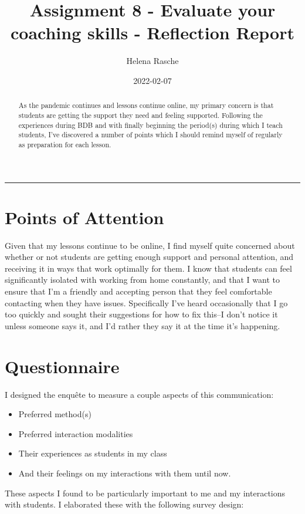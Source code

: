 \documentclass[paper=a4,justified,a4paper]{tufte-handout}
\title[A8 - Evaluation of Coaching Skills]{Assignment 8 - Evaluate your coaching skills - Reflection Report}
\author{Helena Rasche}
\date{2022-02-07}
\providecommand{\tightlist}{%
  \setlength{\itemsep}{0pt}\setlength{\parskip}{0pt}}
\begin{document}
\maketitle
\begin{abstract}
As the pandemic continues and lessons continue online, my primary
concern is that students are getting the support they need and feeling
supported. Following the experiences during BDB and with finally
beginning the period(s) during which I teach students, I've discovered a
number of points which I should remind myself of regularly as
preparation for each lesson.
\end{abstract}
\noindent\rule{5in}{0.4pt}


\hypertarget{points-of-attention}{%
\section{Points of Attention}\label{points-of-attention}}

Given that my lessons continue to be online, I find myself quite
concerned about whether or not students are getting enough support and
personal attention, and receiving it in ways that work optimally for
them. I know that students can feel significantly isolated with working
from home constantly, and that I want to ensure that I'm a friendly and
accepting person that they feel comfortable contacting when they have
issues. Specifically I've heard occasionally that I go too quickly and
sought their suggestions for how to fix this--I don't notice it unless
someone says it, and I'd rather they say it at the time it's happening.

\hypertarget{questionnaire}{%
\section{Questionnaire}\label{questionnaire}}

I designed the enquête to measure a couple aspects of this
communication:

\begin{itemize}
\tightlist
\item
  Preferred method(s)
\item
  Preferred interaction modalities
\item
  Their experiences as students in my class
\item
  And their feelings on my interactions with them until now.
\end{itemize}

These aspects I found to be particularly important to me and my
interactions with students. I elaborated these with the following survey
design:
\end{document}
